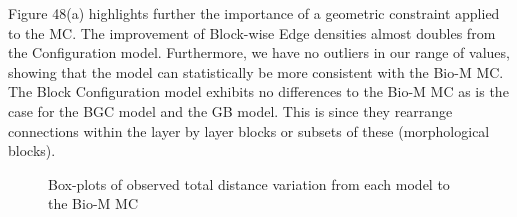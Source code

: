Figure 48(a) highlights further the importance of a geometric constraint applied to the MC. The improvement of Block-wise Edge densities almost doubles from the Configuration model. Furthermore, we have no outliers in our range of values, showing that the model can statistically be more consistent with the Bio-M MC. The Block Configuration model exhibits no differences to the Bio-M MC as is the case for the BGC model and the GB model. This is since they rearrange connections within the layer by layer blocks or subsets of these (morphological blocks).
\begin{figure}[H]%
    \centering
    \captionsetup{justification=centering}
    \qquad
    \caption{Box-plots of observed total distance variation from each model to the Bio-M MC}%
    \label{fig:example}%
\end{figure}


